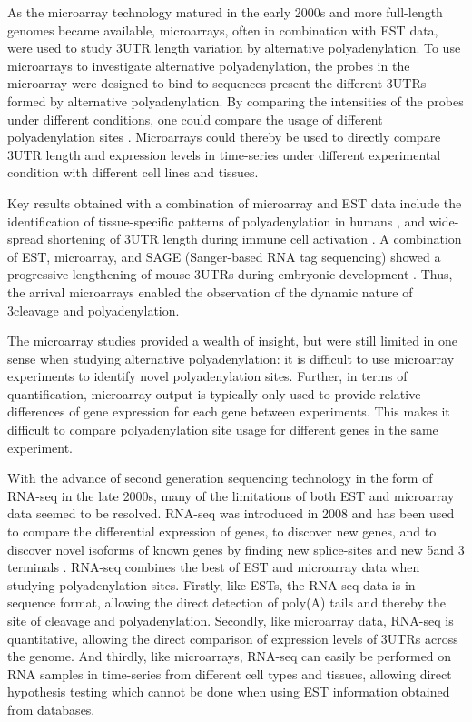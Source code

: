 As the microarray technology matured in the early 2000s and more full-length
genomes became available, microarrays, often in combination with EST data, were
used to study 3\ppp UTR length variation by alternative polyadenylation. To
use microarrays to investigate alternative polyadenylation, the probes in the
microarray were designed to bind to sequences present the different 3\ppp UTRs
formed by alternative polyadenylation. By comparing the intensities of the
probes under different conditions, one could compare the usage of different
polyadenylation sites \cite{sandberg_proliferating_2008, ji_progressive_2009}.
Microarrays could thereby be used to directly compare 3\ppp UTR length and
expression levels in time-series under different experimental condition with
different cell lines and tissues.

Key results obtained with a combination of microarray and EST data include the
identification of tissue-specific patterns of polyadenylation in humans
\cite{zhang_biased_2005}, and wide-spread shortening of 3\ppp UTR length during
immune cell activation \cite{sandberg_proliferating_2008}. A combination of
EST, microarray, and SAGE (Sanger-based RNA tag sequencing) showed a
progressive lengthening of mouse 3\ppp UTRs during embryonic development
\cite{ji_progressive_2009}. Thus, the arrival microarrays enabled the
observation of the dynamic nature of 3\ppp cleavage and polyadenylation.

The microarray studies provided a wealth of insight, but were still limited in
one sense when studying alternative polyadenylation: it is difficult to
use microarray experiments to identify novel polyadenylation sites. Further, in
terms of quantification, microarray output is typically only used to provide
relative differences of gene expression for each gene between experiments. This
makes it difficult to compare polyadenylation site usage for different genes in
the same experiment.

With the advance of second generation sequencing technology in the form of
RNA-seq in the late 2000s, many of the limitations of both EST and microarray
data seemed to be resolved. RNA-seq was introduced in 2008
\cite{nagalakshmi_transcriptional_2008} and has been used to compare the
differential expression of genes, to discover new genes, and to discover novel
isoforms of known genes by finding new splice-sites and new 5\ppp and 3\ppp
terminals \cite{wang_rna-seq:_2009}. RNA-seq combines the best of EST and
microarray data when studying polyadenylation sites. Firstly, like ESTs, the
RNA-seq data is in sequence format, allowing the direct detection of poly(A)
tails and thereby the site of cleavage and polyadenylation. Secondly, like
microarray data, RNA-seq is quantitative, allowing the direct comparison of
expression levels of 3\ppp UTRs across the genome. And thirdly, like
microarrays, RNA-seq can easily be performed on RNA samples in time-series
from different cell types and tissues, allowing direct hypothesis testing
which cannot be done when using EST information obtained from databases. 

